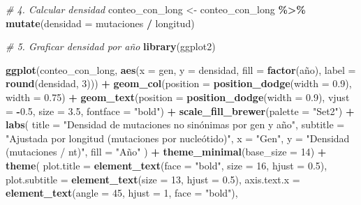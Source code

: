 \documentclass[
]{article}
\newenvironment{Shaded}{\begin{snugshade}}{\end{snugshade}}
\newcommand{\AttributeTok}[1]{\textcolor[rgb]{0.13,0.29,0.53}{#1}}
\newcommand{\CommentTok}[1]{\textcolor[rgb]{0.56,0.35,0.01}{\textit{#1}}}
\newcommand{\DecValTok}[1]{\textcolor[rgb]{0.00,0.00,0.81}{#1}}
\newcommand{\FloatTok}[1]{\textcolor[rgb]{0.00,0.00,0.81}{#1}}
\newcommand{\FunctionTok}[1]{\textcolor[rgb]{0.13,0.29,0.53}{\textbf{#1}}}
\newcommand{\NormalTok}[1]{#1}
\newcommand{\OtherTok}[1]{\textcolor[rgb]{0.56,0.35,0.01}{#1}}
\newcommand{\SpecialCharTok}[1]{\textcolor[rgb]{0.81,0.36,0.00}{\textbf{#1}}}
\newcommand{\StringTok}[1]{\textcolor[rgb]{0.31,0.60,0.02}{#1}}
\begin{document}
\begin{Shaded}
\begin{Highlighting}[]
\CommentTok{\# 4. Calcular densidad}
\NormalTok{conteo\_con\_long }\OtherTok{\textless{}{-}}\NormalTok{ conteo\_con\_long }\SpecialCharTok{\%\textgreater{}\%}
  \FunctionTok{mutate}\NormalTok{(}\AttributeTok{densidad =}\NormalTok{ mutaciones }\SpecialCharTok{/}\NormalTok{ longitud)}

\CommentTok{\# 5. Graficar densidad por año}
\FunctionTok{library}\NormalTok{(ggplot2)}

\FunctionTok{ggplot}\NormalTok{(conteo\_con\_long, }\FunctionTok{aes}\NormalTok{(}\AttributeTok{x =}\NormalTok{ gen, }\AttributeTok{y =}\NormalTok{ densidad, }\AttributeTok{fill =} \FunctionTok{factor}\NormalTok{(año), }\AttributeTok{label =} \FunctionTok{round}\NormalTok{(densidad, }\DecValTok{3}\NormalTok{))) }\SpecialCharTok{+}
  \FunctionTok{geom\_col}\NormalTok{(}\AttributeTok{position =} \FunctionTok{position\_dodge}\NormalTok{(}\AttributeTok{width =} \FloatTok{0.9}\NormalTok{), }\AttributeTok{width =} \FloatTok{0.75}\NormalTok{) }\SpecialCharTok{+}
  \FunctionTok{geom\_text}\NormalTok{(}\AttributeTok{position =} \FunctionTok{position\_dodge}\NormalTok{(}\AttributeTok{width =} \FloatTok{0.9}\NormalTok{), }\AttributeTok{vjust =} \SpecialCharTok{{-}}\FloatTok{0.5}\NormalTok{, }\AttributeTok{size =} \FloatTok{3.5}\NormalTok{, }\AttributeTok{fontface =} \StringTok{"bold"}\NormalTok{) }\SpecialCharTok{+}
  \FunctionTok{scale\_fill\_brewer}\NormalTok{(}\AttributeTok{palette =} \StringTok{"Set2"}\NormalTok{) }\SpecialCharTok{+}
  \FunctionTok{labs}\NormalTok{(}
    \AttributeTok{title =} \StringTok{"Densidad de mutaciones no sinónimas por gen y año"}\NormalTok{,}
    \AttributeTok{subtitle =} \StringTok{"Ajustada por longitud (mutaciones por nucleótido)"}\NormalTok{,}
    \AttributeTok{x =} \StringTok{"Gen"}\NormalTok{,}
    \AttributeTok{y =} \StringTok{"Densidad (mutaciones / nt)"}\NormalTok{,}
    \AttributeTok{fill =} \StringTok{"Año"}
\NormalTok{  ) }\SpecialCharTok{+}
  \FunctionTok{theme\_minimal}\NormalTok{(}\AttributeTok{base\_size =} \DecValTok{14}\NormalTok{) }\SpecialCharTok{+}
  \FunctionTok{theme}\NormalTok{(}
    \AttributeTok{plot.title =} \FunctionTok{element\_text}\NormalTok{(}\AttributeTok{face =} \StringTok{"bold"}\NormalTok{, }\AttributeTok{size =} \DecValTok{16}\NormalTok{, }\AttributeTok{hjust =} \FloatTok{0.5}\NormalTok{),}
    \AttributeTok{plot.subtitle =} \FunctionTok{element\_text}\NormalTok{(}\AttributeTok{size =} \DecValTok{13}\NormalTok{, }\AttributeTok{hjust =} \FloatTok{0.5}\NormalTok{),}
    \AttributeTok{axis.text.x =} \FunctionTok{element\_text}\NormalTok{(}\AttributeTok{angle =} \DecValTok{45}\NormalTok{, }\AttributeTok{hjust =} \DecValTok{1}\NormalTok{, }\AttributeTok{face =} \StringTok{"bold"}\NormalTok{),}

\end{Highlighting}
\end{Shaded}
\end{document}
